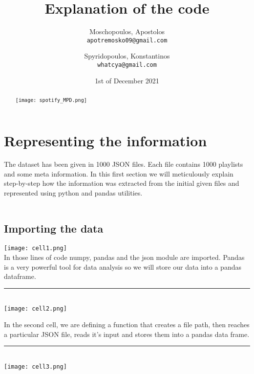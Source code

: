 \documentclass[]{article}
\title{Explanation of the code}
\author{
	Moschopoulos, Apostolos\\
	\texttt{apotremosko09@gmail.com}
	\and
	Spyridopoulos, Konstantinos\\
	\texttt{whatcya@gmail.com}
}
\date{1st of December 2021}
\begin{document}
\maketitle

\begin{abstract}
\texttt{[image: spotify\_MPD.png]}
\end{abstract}

\section{Representing the information}
The dataset has been given in 1000 JSON files. Each file contains 1000 playlists
and some meta information. In this first section we will meticulously explain step-by-step how the information was extracted from the initial given files and represented using python and pandas utilities.\\
\\
\subsection{Importing the data}
\texttt{[image: cell1.png]}
\\
In those lines of code numpy, pandas and the json module are imported. Pandas is a very powerful tool for data analysis so we will store our data into a pandas dataframe.\\
\noindent
{\color{Blue} \rule{\linewidth}{0.5mm}}
\\
\texttt{[image: cell2.png]}


In the second cell, we are defining a function that creates a file path, then reaches a particular JSON file, reads it's input and stores them into a pandas data frame. 
\\
\noindent
{\color{Blue} \rule{\linewidth}{0.5mm}}
\\
\texttt{[image: cell3.png]}
\end{document}
